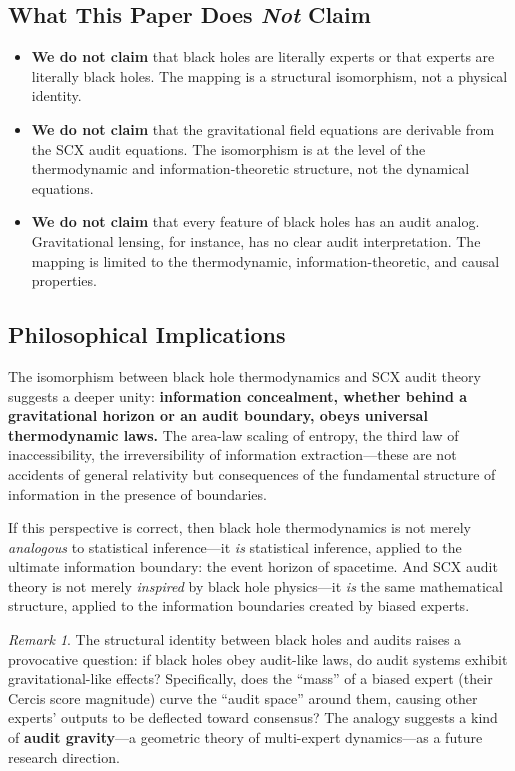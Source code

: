 \documentclass[12pt,a4paper]{article}
\theoremstyle{remark}
\newtheorem{remark}[theorem]{Remark}
\newcommand{\SCX}{\textsf{SCX}}
\newcommand{\Cercis}{\textsf{Cercis}}
\begin{document}
\subsection{What This Paper Does \emph{Not} Claim}

\begin{itemize}[leftmargin=*]
  \item \textbf{We do not claim} that black holes are literally experts or that experts are literally black holes. The mapping is a structural isomorphism, not a physical identity.
  \item \textbf{We do not claim} that the gravitational field equations are derivable from the \SCX{} audit equations. The isomorphism is at the level of the thermodynamic and information-theoretic structure, not the dynamical equations.
  \item \textbf{We do not claim} that every feature of black holes has an audit analog. Gravitational lensing, for instance, has no clear audit interpretation. The mapping is limited to the thermodynamic, information-theoretic, and causal properties.
\end{itemize}

\subsection{Philosophical Implications}

The isomorphism between black hole thermodynamics and \SCX{} audit theory suggests a deeper unity: \textbf{information concealment, whether behind a gravitational horizon or an audit boundary, obeys universal thermodynamic laws.} The area-law scaling of entropy, the third law of inaccessibility, the irreversibility of information extraction---these are not accidents of general relativity but consequences of the fundamental structure of information in the presence of boundaries.

If this perspective is correct, then black hole thermodynamics is not merely \emph{analogous} to statistical inference---it \emph{is} statistical inference, applied to the ultimate information boundary: the event horizon of spacetime. And \SCX{} audit theory is not merely \emph{inspired} by black hole physics---it \emph{is} the same mathematical structure, applied to the information boundaries created by biased experts.

\begin{remark}
The structural identity between black holes and audits raises a provocative question: if black holes obey audit-like laws, do audit systems exhibit gravitational-like effects? Specifically, does the ``mass'' of a biased expert (their \Cercis{} score magnitude) curve the ``audit space'' around them, causing other experts' outputs to be deflected toward consensus? The analogy suggests a kind of \textbf{audit gravity}---a geometric theory of multi-expert dynamics---as a future research direction.
\end{remark}
\end{document}
